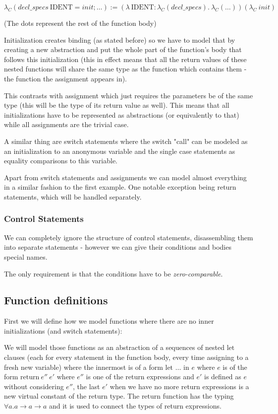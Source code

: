 \begin{defn}
	$$\lambda_C(decl\_specs\ \text{IDENT} = init; \dots) := (\lambda\ \text{IDENT} : \lambda_C(decl\_specs) .\ \lambda_C(\dots)) (\lambda_C\ init)$$
\end{defn}

(The dots represent the rest of the function body)

Initialization creates binding (as stated before) so we have to model that by creating a new abstraction and put the whole part of the function's body that follows this initialization (this in effect means that all the return values of these nested functions will share the same type as the function which contains them - the function the assignment appears in).

This contrasts with assignment which just requires the parameters be of the same type (this will be the type of its return value as well). This means that all initializations have to be represented as abstractions (or equivalently to that) while all assignments are the trivial case.

A similar thing are switch statements where the switch "call" can be modeled as an initialization to an anonymous variable and the single case statements as equality comparisons to this variable.

Apart from switch statements and assignments we can model almost everything in a similar fashion to the first example. One notable exception being return statements, which will be handled separately.

\subsubsection{Control Statements}

We can completely ignore the structure of control statements, disassembling them into separate statements - however we can give their conditions and bodies special names.

The only requirement is that the conditions have to be \emph{zero-comparable}. %

\subsection{Function definitions}

First we will define how we model functions where there are no inner initializations (and switch statements):

We will model those functions as an abstraction of a sequences of nested $\text{let}$ clauses (each for every statement in the function body, every time assigning to a fresh new variable) where the innermost is of a form $\text{let } \dots \text{ in } e$ where $e$ is of the form $\text{return}\ e''\ e'$ where $e''$ is one of the return expressions and $e'$ is defined as $e$ without considering $e''$, the last $e'$ when we have no more return expressions is a new virtual constant of the return type. The $\text{return}$ function has the typing $\forall a . a \rightarrow a \rightarrow a$ and it is used to connect the types of return expressions.


